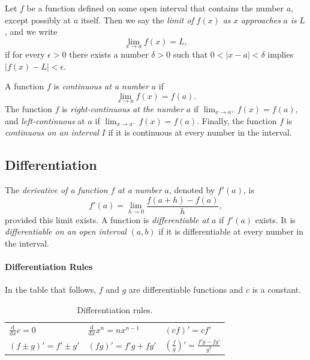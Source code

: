 \documentclass[captions=tableheading]{scrbook}
\begin{document}
\begin{defn}
Let \(f\) be a function defined on some open interval that contains the number \(a\), except possibly at \(a\) itself. Then we say the \emph{limit of} \(f(x)\) \emph{as} \(x\) \emph{approaches} \(a\) \emph{is} \(L\), and we write 
\begin{equation}
\lim_{x \to a}f(x) = L,
\end{equation}
if for every \(\epsilon > 0\) there exists a number \(\delta > 0\) such that \(0 < |x-a| < \delta\) implies \(|f(x) - L| < \epsilon\).
\end{defn}

\begin{defn}
A function \(f\) is \emph{continuous at a number} \(a\) if 
\begin{equation}
\lim_{x \to a} f(x) = f(a).
\end{equation}
The function \(f\) is \emph{right-continuous at the number} \(a\) if \(\lim_{x\to a^{+}}f(x)=f(a)\), and \emph{left-continuous} at \(a\) if \(\lim_{x\to a^{-}}f(x)=f(a)\). Finally, the function \(f\) is \emph{continuous on an interval} \(I\) if it is continuous at every number in the interval. 
\end{defn}
\subsection{Differentiation}
\label{sec-21-2-2}

\begin{defn}
The \emph{derivative of a function} \(f\) \emph{at a number} \(a\), denoted by \(f'(a)\), is
\begin{equation}
f'(a)=\lim_{h\to0}\frac{f(a+h)-f(a)}{h},
\end{equation}
provided this limit exists.
A function is \emph{differentiable at} \(a\) if \(f'(a)\) exists. It is \emph{differentiable on an open interval} \((a,b)\) if it is differentiable at every number in the interval.
\end{defn}



\paragraph*{Differentiation Rules}
In the table that follows, \(f\) and \(g\) are differentiable functions and \(c\) is a constant.

\begin{table}[htb]
\caption[Differentiation rules]{Differentiation rules.} \label{tab:Differentiation-Rules}
\begin{center}
\begin{tabular}{lll}
 \(\frac{\mathrm{d}}{\mathrm{d} x}c=0\)  &  \(\frac{\mathrm{d}}{\mathrm{d} x}x^{n}=nx^{n-1}\)  &  \((cf)'=cf'\)                                        \\
 \((f\pm g)'=f'\pm g'\)                  &  \((fg)'=f'g+fg'\)                                  &  \(\left(\frac{f}{g}\right)'=\frac{f'g-fg'}{g^{2}}\)  \\
\end{tabular}
\end{center}
\end{table}
\end{document}
